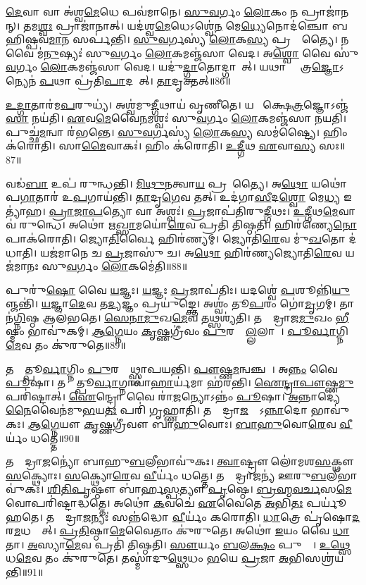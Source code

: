 \ul{𑌦𑍇}𑌵𑌾 𑌵𑌾 𑌅॑𑌶𑍍𑌵\ul{𑌮𑍇}𑌧𑍇 𑌪𑌵॑𑌮𑌾𑌨𑍇।
\ul{𑌸𑍁}\ul{𑌵}𑌰𑍍𑌗𑌂 \ul{𑌲𑍋}𑌕𑌂 𑌨 𑌪𑍍𑌰𑌾𑌜𑌾॑𑌨𑌨𑍍।
𑌤𑌮\ul{𑌶𑍍𑌵𑌃} 𑌪𑍍𑌰𑌾𑌜𑌾॑𑌨𑌾𑌤𑍍।
𑌯𑌦॑𑌶𑍍𑌵\ul{𑌮𑍇}𑌧𑍇\-𑌽𑌶𑍍𑌵𑍇॑\ul{𑌨} 𑌮𑍇\ul{𑌧𑍍𑌯𑍇}𑌨𑍋𑌦॑𑌞𑍍𑌚𑍋 𑌬𑌹𑌿𑌷𑍍𑌪𑌵\ul{𑌮𑌾}𑌨 𑌸𑌰𑍍𑌪॑𑌨𑍍𑌤𑌿।
\ul{𑌸𑍁}\ul{𑌵}𑌰𑍍𑌗𑌸𑍍𑌯॑ \ul{𑌲𑍋}𑌕\ul{𑌸𑍍𑌯} 𑌪𑍍𑌰𑌜𑍍𑌞𑌾᳚𑌤𑍍𑌯𑍈।
𑌨 𑌵𑍈 𑌮॑\ul{𑌨𑍁}𑌷𑍍𑌯𑌃॑ 𑌸𑍁\ul{𑌵}𑌰𑍍𑌗𑌂 \ul{𑌲𑍋}𑌕𑌮𑌞𑍍𑌜॑𑌸𑌾 𑌵𑍇𑌦।
𑌅\ul{𑌶𑍍𑌵𑍋} 𑌵𑍈 𑌸𑍁॑\ul{𑌵}𑌰𑍍𑌗𑌂 \ul{𑌲𑍋}𑌕𑌮𑌞𑍍𑌜॑𑌸𑌾 𑌵𑍇𑌦।
𑌯𑌦𑍁॑\ul{𑌦𑍍𑌗𑌾}𑌤𑍋𑌦𑍍𑌗𑌾𑌯𑍇᳚𑌤𑍍।
𑌯𑌥𑌾 𑌕𑍍𑌷𑍇᳚𑌤𑍍𑌰\ul{𑌜𑍍𑌞𑍋}\-𑌽𑌨𑍍𑌯𑍇𑌨॑ \ul{𑌪}𑌥𑌾 𑌪𑍍𑌰॑𑌤𑌿\ul{𑌪𑌾}𑌦𑌯𑍇᳚𑌤𑍍।
\ul{𑌤𑌾}𑌦𑍃𑌕𑍍𑌤𑌤𑍍॥86॥

\ul{𑌉}\ul{𑌦𑍍𑌗𑌾}𑌤𑌾𑌰॑𑌮\ul{𑌪}𑌰𑍁𑌧𑍍𑌯॑।
𑌅𑌶𑍍𑌵॑𑌮𑍁\ul{𑌦𑍍𑌗𑍀}𑌥𑌾𑌯॑ 𑌵𑍃𑌣𑍀𑌤𑍇।
𑌯𑌥𑌾᳚ 𑌕𑍍𑌷𑍇\ul{𑌤𑍍𑌰}𑌜𑍍𑌞𑍋\-𑌽𑌞𑍍𑌜॑\ul{𑌸𑌾} 𑌨𑌯॑𑌤𑌿।
\ul{𑌏}𑌵\ul{𑌮𑍇}𑌵𑍈\ul{𑌨}𑌮𑌶𑍍𑌵𑌃॑ 𑌸𑍁\ul{𑌵}𑌰𑍍𑌗𑌂 \ul{𑌲𑍋}𑌕𑌮𑌞𑍍𑌜॑𑌸𑌾 𑌨𑌯𑌤𑌿।
𑌪𑍁𑌚𑍍𑌛॑\ul{𑌮}𑌨𑍍𑌵𑌾 𑌰॑𑌭𑌨𑍍𑌤𑍇।
\ul{𑌸𑍁}\ul{𑌵}𑌰𑍍𑌗𑌸𑍍𑌯॑ \ul{𑌲𑍋}𑌕\ul{𑌸𑍍𑌯} 𑌸𑌮॑𑌷𑍍𑌟𑍍𑌯𑍈।
𑌹𑌿𑌂 𑌕॑𑌰𑍋𑌤𑌿।
𑌸𑌾\ul{𑌮𑍈}𑌵𑌾𑌕𑌃॑।
𑌹𑌿𑌂 𑌕॑𑌰𑍋𑌤𑌿।
\ul{𑌉}\ul{𑌦𑍍𑌗𑍀}𑌥 \ul{𑌏}𑌵𑌾\ul{𑌸𑍍𑌯} 𑌸𑌃॥87॥

𑌵𑌡॑\ul{𑌬𑌾} 𑌉𑌪॑ 𑌰𑍁𑌨𑍍𑌧𑌨𑍍𑌤𑌿।
\ul{𑌮𑌿}\ul{𑌥𑍁}\ul{𑌨}𑌤𑍍𑌵𑌾\ul{𑌯} 𑌪𑍍𑌰𑌜𑌾᳚𑌤𑍍𑌯𑍈।
𑌅\ul{𑌥𑍋} 𑌯𑌥𑍋॑𑌪\ul{𑌗𑌾}𑌤𑌾𑌰॑ 𑌉\ul{𑌪}𑌗𑌾𑌯॑𑌨𑍍𑌤𑌿।
\ul{𑌤𑌾}𑌦𑍃\ul{𑌗𑍇}𑌵 𑌤𑌤𑍍।
𑌉𑌦॑𑌗𑌾\ul{𑌸𑍀}𑌦\ul{𑌶𑍍𑌵𑍋} 𑌮𑍇\ul{𑌧𑍍𑌯} 𑌇𑌤𑍍𑌯𑌾॑𑌹।
\ul{𑌪𑍍𑌰𑌾}\ul{𑌜𑌾}\ul{𑌪}𑌤𑍍𑌯𑍋 𑌵𑌾 𑌅𑌶𑍍𑌵𑌃॑।
\ul{𑌪𑍍𑌰}𑌜𑌾𑌪॑𑌤𑌿𑌰𑍁\ul{𑌦𑍍𑌗𑍀}𑌥𑌃।
\ul{𑌉}\ul{𑌦𑍍𑌗𑍀}𑌥\ul{𑌮𑍇}𑌵𑌾𑌵॑ 𑌰𑍁𑌨𑍍𑌧𑍇।
𑌅𑌥𑍋॑ 𑌋\ul{𑌖𑍍𑌸𑌾}𑌮𑌯𑍋॑\ul{𑌰𑍇}𑌵 𑌪𑍍𑌰𑌤𑌿॑ 𑌤𑌿𑌷𑍍𑌠𑌤𑌿।
𑌹𑌿𑌰॑𑌣𑍍𑌯𑍇\ul{𑌨𑍋}𑌪𑌾𑌕॑𑌰𑍋𑌤𑌿।
𑌜𑍍𑌯𑍋\ul{𑌤𑌿}𑌰𑍍𑌵𑍈 𑌹𑌿𑌰॑𑌣𑍍𑌯𑌮𑍍।
𑌜𑍍𑌯𑍋𑌤𑌿॑\ul{𑌰𑍇}𑌵 𑌮𑍁॑\ul{𑌖}𑌤𑍋 𑌦॑𑌧𑌾𑌤𑌿।
𑌯𑌜॑𑌮𑌾𑌨𑍇 𑌚 \ul{𑌪𑍍𑌰}𑌜𑌾𑌸𑍁॑ 𑌚।
𑌅\ul{𑌥𑍋} 𑌹𑌿𑌰॑𑌣𑍍𑌯𑌜𑍍𑌯𑍋𑌤𑌿\ul{𑌰𑍇}𑌵 𑌯𑌜॑𑌮𑌾𑌨𑌃 𑌸𑍁\ul{𑌵}𑌰𑍍𑌗𑌂 \ul{𑌲𑍋}𑌕𑌮𑍇॑𑌤𑌿॥88॥\anuvakamend[𑌤𑌥𑍍𑌸 \ul{𑌉}𑌪𑌾𑌕॑𑌰𑍋𑌤𑌿 \ul{𑌚}𑌤𑍍𑌵𑌾𑌰𑌿॑ 𑌚]

𑌪𑍁𑌰𑍁॑\ul{𑌷𑍋} 𑌵𑍈 \ul{𑌯}𑌜𑍍𑌞𑌃।
\ul{𑌯}𑌜𑍍𑌞𑌃 \ul{𑌪𑍍𑌰}𑌜𑌾𑌪॑𑌤𑌿𑌃।
𑌯𑌦𑌶𑍍𑌵𑍇॑ \ul{𑌪}𑌶𑍂𑌨𑍍𑌨𑌿॑\ul{𑌯𑍁}𑌞𑍍𑌜𑌨𑍍𑌤𑌿॑।
\ul{𑌯}𑌜𑍍𑌞𑌾\ul{𑌦𑍇}𑌵 𑌤\ul{𑌦𑍍𑌯}𑌜𑍍𑌞𑌂 𑌪𑍍𑌰𑌯𑍁॑𑌙𑍍𑌕𑍍𑌤𑍇।
𑌅𑌶𑍍𑌵𑌂॑ 𑌤𑍂\ul{𑌪}𑌰𑌂 𑌗𑍋॑\ul{𑌮𑍃}𑌗𑌮𑍍।
𑌤𑌾𑌨॑\ul{𑌗𑍍𑌨𑌿}𑌷𑍍𑌠 𑌆𑌲॑𑌭𑌤𑍇।
\ul{𑌸𑍇}\ul{𑌨𑌾}\ul{𑌮𑍁}𑌖\ul{𑌮𑍇}𑌵 𑌤𑌥𑍍𑌸𑌶𑍍𑌯॑𑌤𑌿।
𑌤𑌸𑍍𑌮𑌾᳚𑌦𑍍𑌰𑌾𑌜\ul{𑌮𑍁}𑌖𑌂 \ul{𑌭𑍀}𑌷𑍍𑌮𑌂 𑌭𑌾𑌵𑍁॑𑌕𑌮𑍍।
\ul{𑌆}\ul{𑌗𑍍𑌨𑍇}𑌯𑌂 \ul{𑌕𑍃}𑌷𑍍𑌣𑌗𑍍𑌰𑍀॑𑌵𑌂 \ul{𑌪𑍁}𑌰𑌸𑍍𑌤𑌾᳚\ul{𑌲𑍍𑌲}𑌲𑌾𑌟𑍇᳚।
\ul{𑌪𑍂}\ul{𑌰𑍍𑌵𑌾}𑌗𑍍𑌨𑌿\ul{𑌮𑍇}𑌵 𑌤𑌂 𑌕𑍁॑𑌰𑍁𑌤𑍇॥89॥

𑌤𑌸𑍍𑌮𑌾᳚𑌤𑍍𑌪𑍂\ul{𑌰𑍍𑌵𑌾}𑌗𑍍𑌨𑌿𑌂 \ul{𑌪𑍁}𑌰𑌸𑍍𑌤𑌾᳚𑌥𑍍𑌸𑍍𑌥𑌾𑌪𑌯𑌨𑍍𑌤𑌿।
\ul{𑌪𑍗}𑌷𑍍𑌣\ul{𑌮}𑌨𑍍𑌵𑌞𑍍𑌚𑌮𑍍᳚।
𑌅\ul{𑌨𑍍𑌨𑌂} 𑌵𑍈 \ul{𑌪𑍂}𑌷𑌾।
𑌤𑌸𑍍𑌮𑌾᳚𑌤𑍍𑌪𑍂\ul{𑌰𑍍𑌵𑌾}𑌗𑍍𑌨𑌾𑌵𑌾॑\ul{𑌹𑌾}𑌰𑍍𑌯॑𑌮𑌾 𑌹॑𑌰𑌨𑍍𑌤𑌿।
\ul{𑌐}\ul{𑌨𑍍𑌦𑍍𑌰𑌾}\ul{𑌪𑍗}𑌷𑍍𑌣\ul{𑌮𑍁}𑌪𑌰𑌿॑𑌷𑍍𑌟𑌾𑌤𑍍।
\ul{𑌐}𑌨𑍍𑌦𑍍𑌰𑍋 𑌵𑍈 𑌰𑌾॑\ul{𑌜}𑌨𑍍𑌯𑍋\-𑌽𑌨𑍍𑌨𑌂॑ \ul{𑌪𑍂}𑌷𑌾।
\ul{𑌅}𑌨𑍍𑌨𑌾𑌦𑍍𑌯𑍇॑\ul{𑌨𑍈}𑌵𑍈𑌨॑𑌮𑍁\ul{𑌭}𑌯\ul{𑌤𑌃} 𑌪𑌰𑌿॑ 𑌗𑍃𑌹𑍍𑌣𑌾𑌤𑌿।
𑌤𑌸𑍍𑌮𑌾᳚𑌦𑍍𑌰𑌾\ul{𑌜}𑌨𑍍𑌯𑍋᳚\-𑌽\ul{𑌨𑍍𑌨𑌾}𑌦𑍋 𑌭𑌾𑌵𑍁॑𑌕𑌃।
\ul{𑌆}\ul{𑌗𑍍𑌨𑍇}𑌯𑍗 \ul{𑌕𑍃}𑌷𑍍𑌣𑌗𑍍𑌰𑍀॑𑌵𑍗 𑌬𑌾\ul{𑌹𑍁}𑌵𑍋𑌃।
\ul{𑌬𑌾}\ul{𑌹𑍁}𑌵𑍋\ul{𑌰𑍇}𑌵 \ul{𑌵𑍀}𑌰𑍍𑌯𑌂॑ 𑌧𑌤𑍍𑌤𑍇॥90॥

𑌤𑌸𑍍𑌮𑌾᳚𑌦𑍍𑌰𑌾\ul{𑌜}𑌨𑍍𑌯𑍋॑ 𑌬𑌾𑌹𑍁\ul{𑌬}𑌲𑍀𑌭𑌾𑌵𑍁॑𑌕𑌃।
\ul{𑌤𑍍𑌵𑌾}𑌷𑍍𑌟𑍍𑌰𑍗 𑌲𑍋॑𑌮𑌶\ul{𑌸}𑌕𑍍𑌥𑍗 \ul{𑌸}𑌕𑍍𑌥𑍍𑌯𑍋𑌃।
\ul{𑌸}𑌕𑍍𑌥𑍍𑌯𑍋\ul{𑌰𑍇}𑌵 \ul{𑌵𑍀}𑌰𑍍𑌯𑌂॑ 𑌧𑌤𑍍𑌤𑍇।
𑌤𑌸𑍍𑌮𑌾᳚𑌦𑍍𑌰𑌾\ul{𑌜}𑌨𑍍𑌯॑ 𑌊𑌰𑍁\ul{𑌬}𑌲𑍀𑌭𑌾𑌵𑍁॑𑌕𑌃।
\ul{𑌶𑌿}\ul{𑌤𑌿}\ul{𑌪𑍃}𑌷𑍍𑌠𑍗 𑌬𑌾॑𑌰𑍍\mbox{}𑌹\ul{𑌸𑍍𑌪}𑌤𑍍𑌯𑍗 \ul{𑌪𑍃}𑌷𑍍𑌠𑍇।
\ul{𑌬𑍍𑌰}\ul{𑌹𑍍𑌮}\ul{𑌵}\ul{𑌰𑍍𑌚}𑌸\ul{𑌮𑍇}𑌵𑍋𑌪𑌰𑌿॑𑌷𑍍𑌟𑌾𑌦𑍍𑌧𑌤𑍍𑌤𑍇।
𑌅𑌥𑍋॑ \ul{𑌕}𑌵𑌚𑍇॑ \ul{𑌏}𑌵𑍈𑌤𑍇 \ul{𑌅}𑌭𑌿\ul{𑌤𑌃} 𑌪𑌰𑍍𑌯𑍂॑𑌹𑌤𑍇।
𑌤𑌸𑍍𑌮𑌾᳚𑌦𑍍𑌰𑌾\ul{𑌜}𑌨𑍍𑌯𑌃॑ 𑌸𑌨𑍍𑌨॑𑌦𑍍𑌧𑍋 \ul{𑌵𑍀}𑌰𑍍𑌯𑌂॑ 𑌕𑌰𑍋𑌤𑌿।
\ul{𑌧𑌾}𑌤𑍍𑌰𑍇 𑌪𑍃॑𑌷𑍋\ul{𑌦}𑌰\ul{𑌮}𑌧𑌸𑍍𑌤𑌾᳚𑌤𑍍।
\ul{𑌪𑍍𑌰}\ul{𑌤𑌿}𑌷𑍍𑌠𑌾\ul{𑌮𑍇}𑌵𑍈𑌤𑌾𑌂 𑌕𑍁॑𑌰𑍁𑌤𑍇।
𑌅𑌥𑍋॑ \ul{𑌇}𑌯𑌂 𑌵𑍈 \ul{𑌧𑌾}𑌤𑌾।
\ul{𑌅}𑌸𑍍𑌯𑌾\ul{𑌮𑍇}𑌵 𑌪𑍍𑌰𑌤𑌿॑ 𑌤𑌿𑌷𑍍𑌠𑌤𑌿।
\ul{𑌸𑍗}𑌰𑍍𑌯𑌂 \ul{𑌬}𑌲\ul{𑌕𑍍𑌷𑌂} 𑌪𑍁𑌚𑍍𑌛𑍇᳚।
\ul{𑌉}\ul{𑌥𑍍𑌸𑍇}𑌧\ul{𑌮𑍇}𑌵 𑌤𑌂 𑌕𑍁॑𑌰𑍁𑌤𑍇।
𑌤𑌸𑍍𑌮𑌾॑𑌦𑍁\ul{𑌥𑍍𑌸𑍇}𑌧𑌂 \ul{𑌭}𑌯𑍇 \ul{𑌪𑍍𑌰}𑌜𑌾 \ul{𑌅}𑌭𑌿𑌸𑌶𑍍𑌰॑𑌯𑌨𑍍𑌤𑌿॥91॥\anuvakamend[\ul{𑌕𑍁}\ul{𑌰𑍁}\ul{𑌤𑍇} \ul{𑌧}\ul{𑌤𑍍𑌤𑍇} \ul{𑌕𑍁}\ul{𑌰𑍁}\ul{𑌤𑍇} 𑌪𑌞𑍍𑌚॑ 𑌚]




